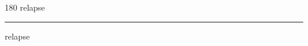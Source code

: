
\begin{frame}
\begin{center}
\begin{turn}{180}
{\fontsize{2.5cm}{1em}\selectfont relapse}
\end{turn}
\vspace{1em}\par  
\hrule
\vspace{1em}\par  
{\fontsize{2.5cm}{1em}\selectfont relapse}
\end{center}
\end{frame}
